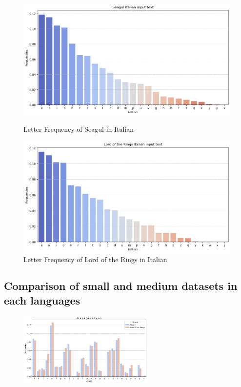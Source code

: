 \begin{figure}[htbp]
    \centering
    \begin{minipage}[b]{0.45\textwidth}
        \centering
        \includegraphics[width=\textwidth]{media/seagulItalian.png} 
        \caption{Letter Frequency of Seagul in Italian}
    \end{minipage}
    \hfill
    \begin{minipage}[b]{0.45\textwidth}
        \centering
        \includegraphics[width=\textwidth]{media/lordOfTheRingsItalian.png}
        \caption{Letter Frequency of Lord of the Rings in Italian}
    \end{minipage}
\end{figure}





\newpage
\subsection*{Comparison of small and medium datasets in each languages} 

\begin{figure}[h]
    \centering
    \includegraphics[width=0.6\textwidth]{media/allEnglish.png}
\end{figure}

